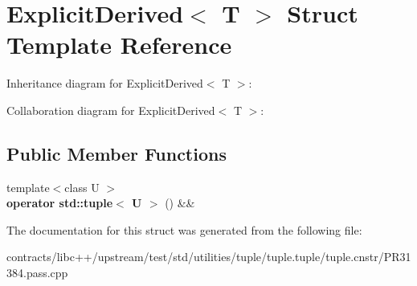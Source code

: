 \hypertarget{struct_explicit_derived}{}\section{Explicit\+Derived$<$ T $>$ Struct Template Reference}
\label{struct_explicit_derived}


Inheritance diagram for Explicit\+Derived$<$ T $>$\+:


Collaboration diagram for Explicit\+Derived$<$ T $>$\+:
\subsection*{Public Member Functions}
\begin{DoxyCompactItemize}
\item 
\mbox{\label{struct_explicit_derived_ad2743558fe85a494b6e05b04b3741e8b}} 
{\footnotesize template$<$class U $>$ }\\{\bfseries operator std\+::tuple$<$ U $>$} () \&\&
\end{DoxyCompactItemize}


The documentation for this struct was generated from the following file\+:\begin{DoxyCompactItemize}
\item 
contracts/libc++/upstream/test/std/utilities/tuple/tuple.\+tuple/tuple.\+cnstr/P\+R31384.\+pass.\+cpp\end{DoxyCompactItemize}
